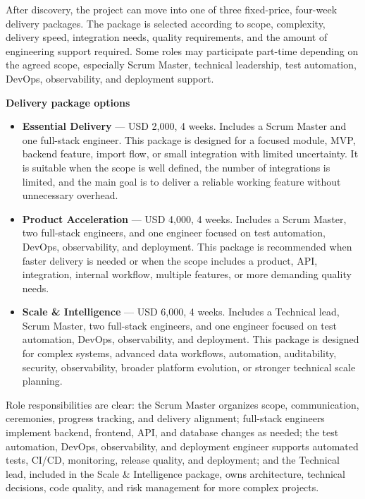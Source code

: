 \documentclass[11pt,a4paper]{article}
\begin{document}
After discovery, the project can move into one of three fixed-price, four-week delivery packages. The package is selected according to scope, complexity, delivery speed, integration needs, quality requirements, and the amount of engineering support required. Some roles may participate part-time depending on the agreed scope, especially Scrum Master, technical leadership, test automation, DevOps, observability, and deployment support.\par

\textbf{Delivery package options}\par

\begin{itemize}
\item \textbf{Essential Delivery} --- USD 2,000, 4 weeks. Includes a Scrum Master and one full-stack engineer. This package is designed for a focused module, MVP, backend feature, import flow, or small integration with limited uncertainty. It is suitable when the scope is well defined, the number of integrations is limited, and the main goal is to deliver a reliable working feature without unnecessary overhead.
\item \textbf{Product Acceleration} --- USD 4,000, 4 weeks. Includes a Scrum Master, two full-stack engineers, and one engineer focused on test automation, DevOps, observability, and deployment. This package is recommended when faster delivery is needed or when the scope includes a product, API, integration, internal workflow, multiple features, or more demanding quality needs.
\item \textbf{Scale \& Intelligence} --- USD 6,000, 4 weeks. Includes a Technical lead, Scrum Master, two full-stack engineers, and one engineer focused on test automation, DevOps, observability, and deployment. This package is designed for complex systems, advanced data workflows, automation, auditability, security, observability, broader platform evolution, or stronger technical scale planning.
\end{itemize}

Role responsibilities are clear: the Scrum Master organizes scope, communication, ceremonies, progress tracking, and delivery alignment; full-stack engineers implement backend, frontend, API, and database changes as needed; the test automation, DevOps, observability, and deployment engineer supports automated tests, CI/CD, monitoring, release quality, and deployment; and the Technical lead, included in the Scale \& Intelligence package, owns architecture, technical decisions, code quality, and risk management for more complex projects.\par
\end{document}
